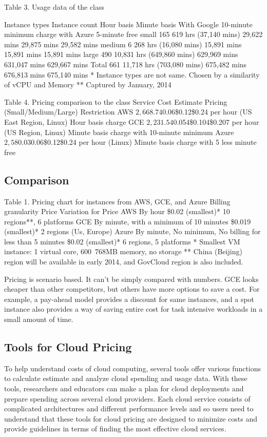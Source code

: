 \documentclass{sig-alternate}
\begin{document}
Table 3. Usage data of the class

Instance types	Instance count	Hour basis	Minute basis	With Google 10-minute minimum charge	with Azure 5-minute free
small	165	619 hrs (37,140 mins)	29,622 mins	29,875 mins	29,582 mins
medium	6	268 hrs (16,080 mins)	15,891 mins	15,891 mins	15,891 mins
large	490	10,831 hrs (649,860 mins)	629,969 mins	631,047 mins	629,667 mins
Total	661	11,718 hrs (703,080 mins)	675,482 mins	676,813 mins	675,140 mins
* Instance types are not same. Chosen by a similarity of vCPU and Memory
** Captured by January, 2014

Table 4. Pricing comparison to the class
Service	Cost Estimate	Pricing (Small/Medium/Large)	Restriction
AWS	$2,668.74	$0.06\$0.12\$0.24 per hour (US East Region, Linux)	Hour basis charge
GCE	$2,231.54	$0.054\$0.104\$0.207 per hour (US Region, Linux)	Minute basis charge with 10-minute minimum
Azure	$2,580.03	$0.06\$0.12\$0.24 per hour (Linux)	Minute basis charge with 5 less minute free

\subsection{Comparison}

Table 1. Pricing chart for instances from AWS, GCE, and Azure
	Billing granularity	Price	Variation for Price
AWS	By hour	\$0.02 (smallest)*	10 regions**, 6 platforms
GCE	By minute, with a minimum of 10 minutes	\$0.019 (smallest)*	2 regions (Us, Europe)
Azure	By minute, No minimum, No billing for less than 5 minutes	\$0.02 (smallest)*	6 regions, 5 platforms
* Smallest VM instance: 1 virtual core, 600~768MB memory, no storage
** China (Beijing) region will be available in early 2014, and GovCloud region is also included.

Pricing is scenario based. It can't be simply compared with numbers. GCE looks cheaper than other competitors, but others have more options to save a cost. For example, a pay-ahead model provides a discount for same instances, and a spot instance also provides a way of saving entire cost for task intensive workloads in a small amount of time.


\subsection{Tools for Cloud Pricing}

To help understand costs of cloud computing, several tools offer various functions to calculate estimate and analyze cloud spending and usage data. With these tools, researchers and educators can make a plan for cloud deployments and prepare spending across several cloud providers. Each cloud service consists of complicated architectures and different performance levels and so users need to understand that these tools for cloud pricing are designed to minimize costs and provide guidelines in terms of finding the most effective cloud services.
\end{document}
